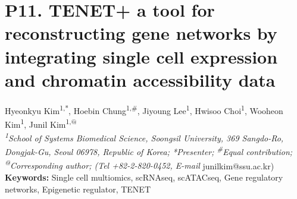 \section*{P11. TENET+ a tool for reconstructing gene networks by integrating single cell expression and chromatin accessibility data}

\begin{center}
Hyeonkyu Kim\textsuperscript{1,*}, Hoebin Chung\textsuperscript{1,\#}, Jiyoung Lee\textsuperscript{1}, Hwisoo Choi\textsuperscript{1}, Wooheon Kim\textsuperscript{1}, Junil Kim\textsuperscript{1,@} \\
\vspace{0.2cm}
\textit{\textsuperscript{1}School of Systems Biomedical Science, Soongsil University, 369 Sangdo-Ro, Dongjak-Gu, Seoul 06978, Republic of Korea; *Presenter; \textsuperscript{\#}Equal contribution; \textsuperscript{@}Corresponding author; (Tel +82-2-820-0452, E-mail} junilkim@ssu.ac.kr) \\
\vspace{0.2cm}
\textbf{Keywords:} Single cell multiomics, scRNAseq, scATACseq, Gene regulatory networks, Epigenetic regulator, TENET
\end{center}


